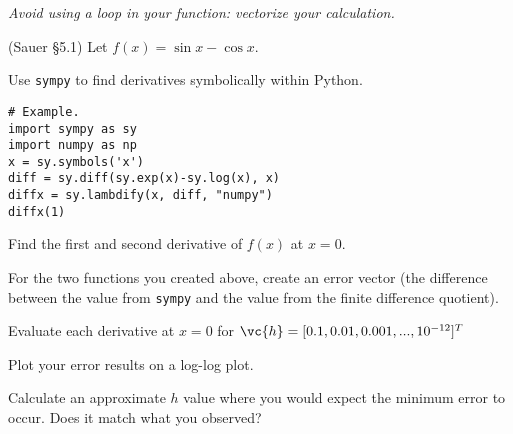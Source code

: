 \documentclass[12pt,letterpaper,noanswers]{exam}
\begin{document}
\begin{questions}
\begin{parts}
\emph{Avoid using a loop in your function: vectorize your calculation.}
\end{parts}









\question (Sauer \S 5.1)
Let $f(x) = \sin x - \cos x$. 

\begin{parts}


\item  

Use \texttt{sympy} to find derivatives symbolically within Python.

\begin{verbatim}
# Example.
import sympy as sy
import numpy as np
x = sy.symbols('x')
diff = sy.diff(sy.exp(x)-sy.log(x), x)
diffx = sy.lambdify(x, diff, "numpy")
diffx(1)
\end{verbatim}

Find the first and second derivative of $f(x)$ at $x = 0$.

\item 

For the two functions you created above, create an error vector (the difference between the value from \texttt{sympy} and the value from the finite difference quotient).  

Evaluate each derivative at $x = 0$ for $\vc{h} = [0.1,0.01,0.001,...,10^{-12}]^T$


\item Plot your error results on a log-log plot.

\item Calculate an approximate $h$ value where you would expect the minimum error to occur.  Does it match what you observed?

\end{parts}


\end{questions}
\end{document}
